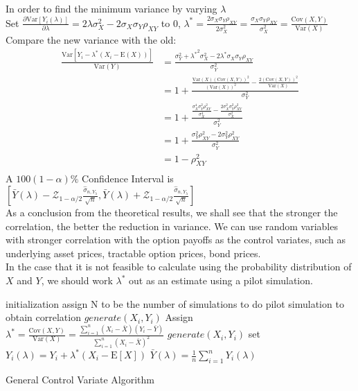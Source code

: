 In order to find the minimum variance by varying $\lambda$\\[2mm]
Set $\frac{\partial \mathrm{Var}[Y_{i}(\lambda)]}{\partial \lambda} = 2\lambda \sigma_{X}^{2} - 2\sigma_{X}\sigma_{Y}\rho_{XY}$ to 0, $ \lambda^{*} = \frac{2\sigma_{X}\sigma_{Y}\rho_{XY}}{2\sigma_{X}^{2}} = \frac{\sigma_{X}\sigma_{Y}\rho_{XY}}{\sigma_{X}^{2}} = \frac{\mathrm{Cov}(X,Y)}{\mathrm{Var}(X)}$\\
Compare the new variance with the old:
\begin{equation*}
\begin{split}
\frac{\mathrm{Var} [Y_{i} - \lambda^{*}(X_{i} - \mathrm{E}(X))]}{\mathrm{Var}(Y)}
&=\frac{\sigma_{Y}^{2} + {\lambda^{*}}^{2}\sigma_{X}^{2}-2\lambda^{*}\sigma_{X}\sigma_{Y}\rho_{XY}}{\sigma_{Y}^{2}} \\
&=1+\frac{\frac{\mathrm{Var}(X)(\mathrm{Cov}(X,Y))^{2}}{(\mathrm{Var}(X))^{2}}-\frac{2(\mathrm{Cov}(X,Y))^{2}}{\mathrm{Var}(X)}}{\sigma_{Y}^{2}}\\
&=1+\frac{\frac{\sigma_{X}^{4}\sigma_{Y}^{2}\rho_{XY}^{2}}{\sigma_{X}^{4}}-\frac{2\sigma_{X}^{2}\sigma_{Y}^{2}\rho_{XY}^{2}}{\sigma_{X}^{2}}}{\sigma_{Y}^{2}}\\
&=1+\frac{\sigma_{Y}^{2}\rho_{XY}^{2}-2\sigma_{Y}^{2}\rho_{XY}^{2}}{\sigma_{Y}^{2}}\\
&=1-\rho_{XY}^{2}\\
\end{split}
\end{equation*}
A $100(1-\alpha)\%$ Confidence Interval is $ [\bar{Y}(\lambda) - \mathcal{Z}_{1-\alpha/2} \frac{\hat{\sigma}_{n, Y_{\lambda}}}{\sqrt{n}}, \bar{Y}(\lambda) + \mathcal{Z}_{1-\alpha/2} \frac{\hat{\sigma}_{n, Y_{\lambda}}}{\sqrt{n}}]$\\
\newpage
As a conclusion from the theoretical results, we shall see that the stronger the correlation, the better the reduction in variance. We can use random variables with stronger correlation with the option payoffs as the control variates, such as underlying asset prices, tractable option prices, bond prices.\\
In the case that it is not feasible to calculate using the probability distribution of $X$ and $Y$, we should work $\lambda^{*}$ out as an estimate using a pilot simulation.\\[5mm]
\begin{algorithm}[H]
 initialization\;
 assign N to be the number of simulations to do\;
 pilot simulation to obtain correlation\;
  {
 \quad $generate(X_{i}, Y_{i})$\;
 }
 Assign $\lambda^{*} = \frac{\mathrm{Cov}(X,Y)}{\mathrm{Var}(X)} = \frac{\sum_{i=1}^{n}(X_{i}-\bar{X})(Y_{i}-\bar{Y})}{\sum_{i=1}^{n}(X_{i}-\bar{X})^{2}}$\;
  {
	\quad $generate(X_{i}, Y_{i})$\;
	\quad set ${Y}_{i}(\lambda) = Y_{i} + \lambda^{*}(X_{i}-\mathrm{E}[X])$\;
 }
 $\bar{Y}(\lambda) = \frac{1}{n} \sum_{i=1}^{n} {Y}_{i}(\lambda)$\;
\caption{General Control Variate Algorithm}
\end{algorithm}
